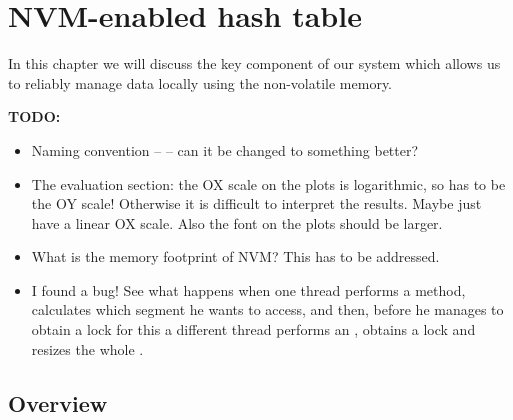 \chapter{NVM-enabled hash table}
In this chapter we will discuss the key component of our system which allows us to reliably manage data locally using the non-volatile memory. 

\bigskip

\noindent \textbf{TODO:}
\begin{itemize}
    \item Naming convention -- \internalHashMap -- can it be changed to something better?
    \item The evaluation section: the OX scale on the plots is logarithmic, so has to be the OY scale! Otherwise it is difficult to interpret the results. Maybe just have a linear OX scale. Also the font on the plots should be larger.
    \item What is the memory footprint of NVM? This has to be addressed.
    \item I found a bug! See what happens when one thread performs a \getMethod method, calculates which segment he wants to access, and then, before he manages to obtain a lock for this \internalHashMap a different thread performs an \insertMethod, obtains a lock and resizes the whole \internalHashMap. 
\end{itemize}

\section{Overview}

